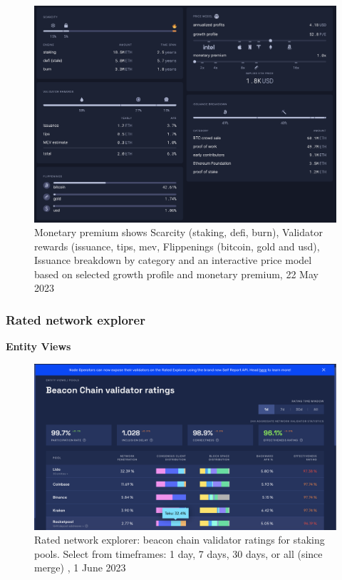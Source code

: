 \documentclass[UTF8]{article}
\begin{document}
{\begin{figure}[htbp]
\begin{center}
\includegraphics[width=0.9\linewidth]{images/monetary}
\caption{Monetary premium shows Scarcity (staking, defi, burn), Validator rewards (issuance, tips, mev, Flippenings (bitcoin, gold and usd), Issuance breakdown by category and an interactive price model based on selected growth profile and monetary premium, 22 May 2023}
\label{fig:monetary}
\end{center}
\end{figure}
\clearpage


\subsubsection*{Rated network explorer}
\textbf{Entity Views} \\
\begin{figure}[htbp]
\begin{center}
\includegraphics[width=\linewidth]{images/ratedentity1}
\caption{Rated network explorer: beacon chain validator ratings for staking pools. Select from timeframes: 1 day, 7 days, 30 days, or all (since merge) , 1 June 2023}
\label{fig:ratedentity1}
\end{center}
\end{figure}

}
\end{document}
